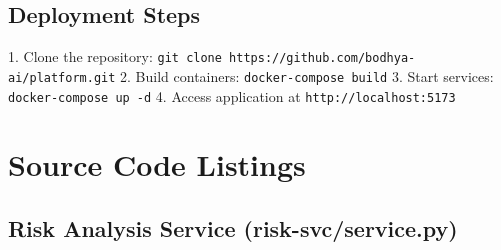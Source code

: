 \documentclass[12pt,a4paper]{report}
\begin{document}
\subsection{Deployment Steps}
1. Clone the repository: \texttt{git clone https://github.com/bodhya-ai/platform.git}
2. Build containers: \texttt{docker-compose build}
3. Start services: \texttt{docker-compose up -d}
4. Access application at \texttt{http://localhost:5173}

\section{Source Code Listings}

\subsection{Risk Analysis Service (risk-svc/service.py)}
\end{document}
